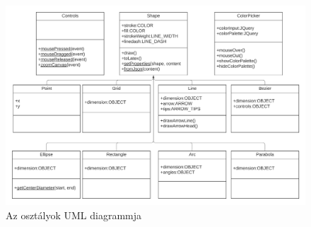



\begin{figure}[!h]
	\includegraphics[width=\textwidth]{images/uml.png}
	\caption{Az osztályok UML diagrammja}
	\label{fig:uml1}
\end{figure}



